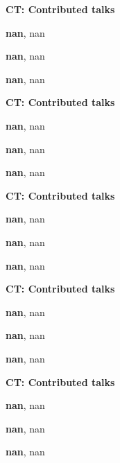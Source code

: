 \documentclass[ILAS2025-program.tex]{subfiles}
\begin{document}
\begin{description}
    \begin{description}
    \item[] {\color{mstitle}\textbf{CT: Contributed talks}} 
    \item[] \textbf{nan}, nan
        \item[] \textbf{nan}, nan
        \item[] \textbf{nan}, nan
        \end{description}
    \begin{description}
    \item[] {\color{mstitle}\textbf{CT: Contributed talks}} 
    \item[] \textbf{nan}, nan
        \item[] \textbf{nan}, nan
        \item[] \textbf{nan}, nan
        \end{description}
    \begin{description}
    \item[] {\color{mstitle}\textbf{CT: Contributed talks}} 
    \item[] \textbf{nan}, nan
        \item[] \textbf{nan}, nan
        \item[] \textbf{nan}, nan
        \end{description}
    \begin{description}
    \item[] {\color{mstitle}\textbf{CT: Contributed talks}} 
    \item[] \textbf{nan}, nan
        \item[] \textbf{nan}, nan
        \item[] \textbf{nan}, nan
        \end{description}
    \begin{description}
    \item[] {\color{mstitle}\textbf{CT: Contributed talks}} 
    \item[] \textbf{nan}, nan
        \item[] \textbf{nan}, nan
        \item[] \textbf{nan}, nan

\end{description}
\end{description}
\end{document}

